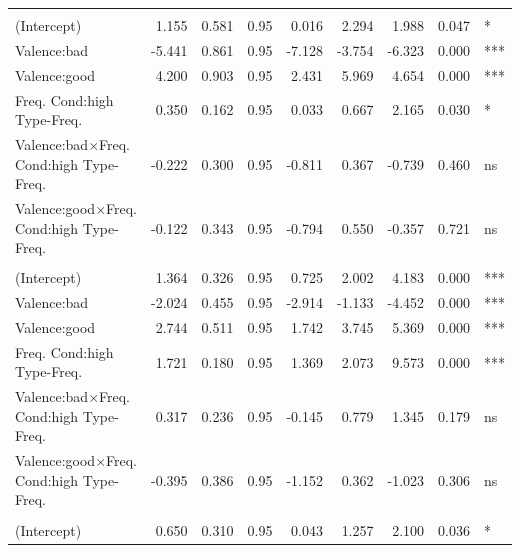 \documentclass[
]{article}
\begin{document}
\begin{longtable}[t]{lrrrrrrrl}
\endfoot
\bottomrule
\endlastfoot
\addlinespace[0.3em]
\multicolumn{9}{l}{\textbf{First Party Acceptability}}\\
\hspace{1em}(Intercept) & 1.155 & 0.581 & 0.95 & 0.016 & 2.294 & 1.988 & 0.047 & *\\
\hspace{1em}Valence:bad & -5.441 & 0.861 & 0.95 & -7.128 & -3.754 & -6.323 & 0.000 & ***\\
\hspace{1em}Valence:good & 4.200 & 0.903 & 0.95 & 2.431 & 5.969 & 4.654 & 0.000 & ***\\
Freq.
Cond:high
\hspace{1em}Type-Freq. & 0.350 & 0.162 & 0.95 & 0.033 & 0.667 & 2.165 & 0.030 & *\\
Valence:bad$\times$Freq.
Cond:high
\hspace{1em}Type-Freq. & -0.222 & 0.300 & 0.95 & -0.811 & 0.367 & -0.739 & 0.460 & ns\\
Valence:good$\times$Freq.
Cond:high
\hspace{1em}Type-Freq. & -0.122 & 0.343 & 0.95 & -0.794 & 0.550 & -0.357 & 0.721 & ns\\
\addlinespace[0.3em]
\multicolumn{9}{l}{\textbf{Third Party Acceptability}}\\
\hspace{1em}(Intercept) & 1.364 & 0.326 & 0.95 & 0.725 & 2.002 & 4.183 & 0.000 & ***\\
\hspace{1em}Valence:bad & -2.024 & 0.455 & 0.95 & -2.914 & -1.133 & -4.452 & 0.000 & ***\\
\hspace{1em}Valence:good & 2.744 & 0.511 & 0.95 & 1.742 & 3.745 & 5.369 & 0.000 & ***\\
Freq.
Cond:high
\hspace{1em}Type-Freq. & 1.721 & 0.180 & 0.95 & 1.369 & 2.073 & 9.573 & 0.000 & ***\\
Valence:bad$\times$Freq.
Cond:high
\hspace{1em}Type-Freq. & 0.317 & 0.236 & 0.95 & -0.145 & 0.779 & 1.345 & 0.179 & ns\\
Valence:good$\times$Freq.
Cond:high
\hspace{1em}Type-Freq. & -0.395 & 0.386 & 0.95 & -1.152 & 0.362 & -1.023 & 0.306 & ns\\
\addlinespace[0.3em]
\multicolumn{9}{l}{\textbf{Prevalence}}\\
\hspace{1em}(Intercept) & 0.650 & 0.310 & 0.95 & 0.043 & 1.257 & 2.100 & 0.036 & *\\

\end{longtable}
\end{document}

